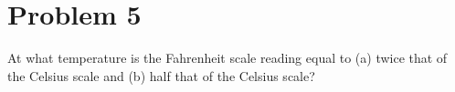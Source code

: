 \documentclass[12pt]{article}
\begin{document}
    





    \section{Problem 5}
        At what temperature is the Fahrenheit scale reading equal to (a) twice that of the Celsius scale and (b) half that of the Celsius scale?
\end{document}
